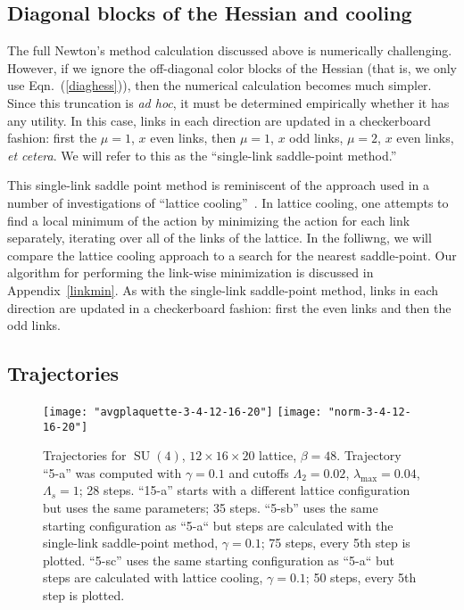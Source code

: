 \documentclass[preprint,aps,prd]{revtex4-2}
\DeclareMathOperator{\SU}{SU}
\begin{document}
\subsection{Diagonal blocks of the Hessian and cooling}

The full Newton's method calculation discussed above is numerically
challenging.
However, if we ignore the off-diagonal color blocks of the
Hessian (that is, we only use Eqn.~(\ref{diaghess})),
then the numerical calculation becomes much simpler.  Since this truncation
is {\em ad hoc}, it must be determined empirically whether it
has any utility.  In this case, links in each direction
are updated in a checkerboard fashion: first the
$\mu=1$, $x$ even links, then $\mu=1$, $x$ odd links,
$\mu=2$, $x$ even links, {\em et cetera}.  We will refer to this
as the ``single-link saddle-point method.''


This single-link saddle point method is reminiscent of the
approach used in a number of investigations of ``lattice
cooling''~\cite{trottier_exploring_1994,teper_cooling_1994,
  gonzalez-arroyo_gauge_1995,gonzalez-arroyo_classical_1996,
  bonati_comparison_2014}.
In lattice cooling, one attempts to find a local minimum
of the action by minimizing the action for
each link separately, iterating over all of the links of the lattice.
In the folliwng, we will compare the lattice cooling approach to
a search for the nearest saddle-point.  Our algorithm for performing
the link-wise minimization is discussed in Appendix~\ref{linkmin}.
As with the single-link saddle-point method, links in each direction
are updated in a checkerboard fashion:  first the even links and
then the odd links.

\subsection{Trajectories}

\begin{figure}
\texttt{[image: "avgplaquette-3-4-12-16-20"]}
\hfill
\texttt{[image: "norm-3-4-12-16-20"]}
\caption{Trajectories for $\SU(4)$, $12 \times 16 \times 20$ lattice,
  $\beta=48$. Trajectory ``5-a'' was computed with $\gamma = 0.1$ and
  cutoffs $\Lambda_2=0.02$, $\lambda_\mathrm{max}=0.04$, $\Lambda_s = 1$;
  28 steps.
  ``15-a'' starts with a different lattice configuration but uses the
   same parameters; 35 steps.
   ``5-sb'' uses the same starting configuration as ``5-a`` but steps
   are calculated with the single-link saddle-point method,
     $\gamma=0.1$; 75 steps, every 5th step is plotted.
   ``5-sc'' uses the same starting configuration as ``5-a`` but steps
   are calculated with lattice cooling,
     $\gamma=0.1$; 50 steps, every 5th step is plotted.
    \label{trajectory3}}
\end{figure}
\end{document}
